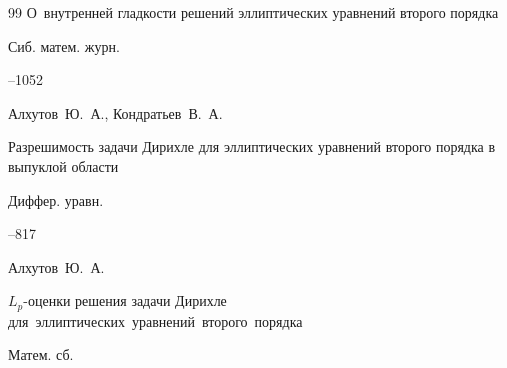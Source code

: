 \begin{thebibliography}{99}
\paper О~внутренней гладкости решений эллиптических уравнений второго порядка

\jour Сиб. матем. журн.




--1052

















\by Алхутов~Ю.~А., Кондратьев~В.~А.

\paper Разрешимость задачи Дирихле для эллиптических уравнений второго порядка в выпуклой области

\jour Диффер. уравн.




--817





\by Алхутов~Ю.~А.

\paper $L_p$-оценки решения задачи Дирихле для~эллиптических~уравнений~второго~порядка

\jour Матем. сб.



\end{thebibliography}
